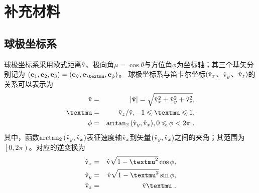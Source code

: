 
\chapter{补充材料}


\section{球极坐标系}

球极坐标系采用欧式距离$\hat{\mathrm{v}}$、极向角$\mu=\cos{\theta}$与方位角$\phi$为坐标轴；其三个基矢分别记为
$(\bfe_1, \bfe_2, \bfe_3) = (\bfe_{\vh}, \bfe_{\mu}, \bfe_{\phi})$。
球极坐标系与笛卡尔坐标$(\hat{\mathrm{v}}_x$、$\hat{\mathrm{v}}_y$、$\hat{\mathrm{v}}_z )$的关系可以表示为
   \begin{eqnarray}
       \rmvh &= & \left |\vh \right| = \sqrt{\rmvh_x^2 +\rmvh_y^2 +\rmvh_z^2},\label{vhxyz}  \\
       \mu &=& \rmvh_z / \rmvh,   -1 \le \mu \le 1, \label{vmu} \\
       \phi &=& \arctan_2{\left(\rmvh_y,\rmvh_x \right)},   0 \le \phi <2 \pi ~. \label{vphi}
   \end{eqnarray}
   其中，函数$\arctan_2{\left(\hat{\mathrm{v}}_y,\hat{\mathrm{v}}_x \right)}$表征速度轴$\hat{\mathrm{v}}_x$到矢量$\left(\hat{\mathrm{v}}_y,\hat{\mathrm{v}}_x \right)$之间的夹角；其范围为$\left[0,2\pi \right)$。对应的逆变换为
   \begin{eqnarray}
       \rmvh_x &= & \rmvh \sinQ \cos{\phi}, \label{vhx} \\
       \rmvh_y &= & \rmvh \sinQ \sin{\phi}, \label{vhy} \\
       \rmvh_z &= & \rmvh \mu ~. \label{vhz}
   \end{eqnarray}

